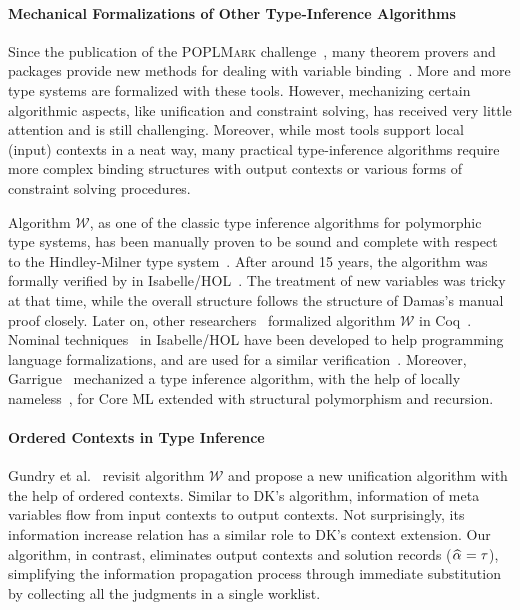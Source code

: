 \paragraph{Mechanical Formalizations of Other Type-Inference Algorithms}
Since the publication of the \textsc{POPLMark} challenge~\cite{aydemir2005mechanized},
many theorem provers and packages provide new methods for dealing
with variable binding~\cite{aydemir2008engineering,urban2008nominalTech,chlipala2008parametric}.
More and more type systems are formalized with these tools.
However, mechanizing certain algorithmic aspects, like unification and
constraint solving, has received very little attention and is still challenging.
Moreover, while most tools support local (input) contexts in a neat way,
many practical type-inference algorithms require
more complex binding structures with output contexts or various forms of constraint solving procedures.

Algorithm $\mathcal{W}$,
as one of the classic type inference algorithms for polymorphic type systems,
has been manually proven to be sound and complete
with respect to the Hindley-Milner type system~\cite{hindley1969principal,milner1978theory,damas1982principal}.
After around 15 years, the algorithm was formally verified by
\citet{naraschewski1999type} in Isabelle/HOL~\cite{nipkow2002isabelle}.
The treatment of new variables was tricky at that time, while the overall structure follows the
structure of Damas's manual proof closely.
Later on, other researchers~\cite{dubois2000proving,dubois1999certification}
formalized algorithm $\mathcal{W}$ in Coq~\cite{Coq}.
Nominal techniques~\cite{urban2008nominalTech} in Isabelle/HOL have been
developed to help programming language formalizations, and are used for a similar
verification~\cite{urban2008nominal}. Moreover, Garrigue~\cite{garrigue2015certified}
mechanized a type inference algorithm,
with the help of locally nameless~\cite{LocallyNameless},
for Core ML extended with structural polymorphism and recursion.

\paragraph{Ordered Contexts in Type Inference}
Gundry et al.~\cite{gundry2010type} revisit algorithm $\mathcal{W}$ and
propose a new unification algorithm with the help of ordered contexts.
Similar to DK's algorithm, information of meta variables flow from input contexts to output contexts.
Not surprisingly, its information increase relation has a similar role to DK's context extension.
Our algorithm, in contrast,
eliminates output contexts and solution records ($\al = \tau$),
simplifying the information propagation process through immediate substitution
by collecting all the judgments in a single worklist.

